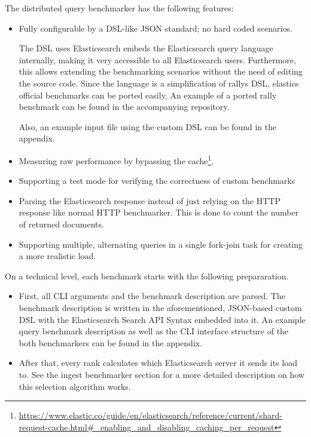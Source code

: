 The distributed query benchmarker has the following features:
\begin{itemize}
  \item Fully configurable by a \ac{DSL}-like \ac{JSON} standard; no hard coded scenarios.

    The \ac{DSL} uses Elasticsearch embeds the Elasticsearch query language internally, making it very accessible to all Elasticsearch users. Furthermore, this allows extending the benchmarking scenarios without the need of editing the source code. Since the language is a simplification of rallys \ac{DSL}, elastics official benchmarks can be ported easily. An example of a ported rally benchmark can be found in the accompanying repository.

    Also, an example input file using the custom \ac{DSL} can be found in the appendix.
  \item Measuring raw performance by bypassing the cache\footnote{\url{https://www.elastic.co/guide/en/elasticsearch/reference/current/shard-request-cache.html\#_enabling_and_disabling_caching_per_request}}.
  \item Supporting a test mode for verifying the correctness of custom benchmarks
  \item Parsing the Elasticsearch response instead of just relying on the HTTP response like normal HTTP benchmarker. This is done to count the number of returned documents.
  \item Supporting multiple, alternating queries in a single fork-join task for creating a more realistic load.
\end{itemize}

On a technical level, each benchmark starts with the following prepararation.
\begin{itemize}
  \item First, all \ac{CLI} arguments and the benchmark description are parsed. The benchmark description is written in the aforementioned, JSON-based custom DSL with the Elasticsearch Search API Syntax embedded into it. An example query benchmark description as well as the \ac{CLI} interface structure of the both benchmarkers can be found in the appendix.
  \item After that, every rank calculates which Elasticsearch server it sends its load to. See the ingest benchmarker section for a more detailed description on how this selection algorithm works.
\end{itemize}

